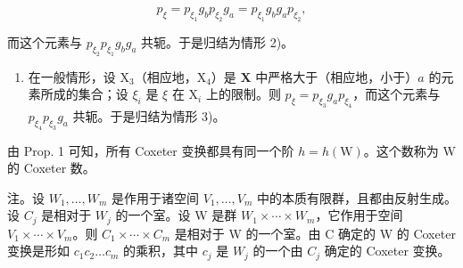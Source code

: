 \[
p _ {\xi} = p _ {\xi_ {1}} g _ {b} p _ {\xi_ {2}} g _ {a} = p _ {\xi_ {1}} g _ {b} g _ {a} p _ {\xi_ {2}},
\]

而这个元素与 \(p_{\xi_2}p_{\xi_1}g_b g_a\) 共轭。于是归结为情形 2)。

\begin{enumerate}
\def\labelenumi{\arabic{enumi})}
\setcounter{enumi}{3}
\tightlist
\item
  在一般情形，设 \(\mathrm{X}_3\)（相应地，\(\mathrm{X}_4\)）是 \(\mathbf{X}\) 中严格大于（相应地，小于）\(a\) 的元素所成的集合；设 \(\xi_i\) 是 \(\xi\) 在 \(\mathrm{X}_i\) 上的限制。则 \(p_{\xi} = p_{\xi_3}g_a p_{\xi_4}\)，而这个元素与 \(p_{\xi_4}p_{\xi_3}g_a\) 共轭。于是归结为情形 3)。
\end{enumerate}

由 Prop. 1 可知，所有 Coxeter 变换都具有同一个阶 \(h = h(\mathrm{W})\)。这个数称为 W 的 Coxeter 数。

注。设 \(W_{1},\ldots,W_{m}\) 是作用于诸空间 \(V_{1},\ldots,V_{m}\) 中的本质有限群，且都由反射生成。设 \(C_{j}\) 是相对于 \(W_{j}\) 的一个室。设 W 是群 \(W_{1}\times\cdots\times W_{m}\)，它作用于空间 \(V_{1}\times\cdots\times V_{m}\)。则 \(C_{1}\times\cdots\times C_{m}\) 是相对于 W 的一个室。由 C 确定的 W 的 Coxeter 变换是形如 \(c_{1}c_{2}\ldots c_{m}\) 的乘积，其中 \(c_{j}\) 是 \(W_{j}\) 的一个由 \(C_{j}\) 确定的 Coxeter 变换。

